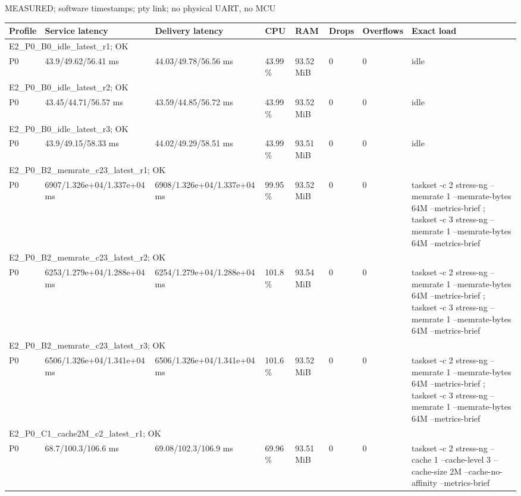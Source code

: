 \par\noindent MEASURED; software timestamps; pty link; no physical UART, no MCU\par
\begin{tabular}{llllllll}
\toprule
Profile & Service latency & Delivery latency & CPU & RAM & Drops & Overflows & Exact load \\
\midrule
\multicolumn{8}{l}{E2\_P0\_B0\_idle\_latest\_r1; OK} \\
P0 & 43.9/49.62/56.41 ms & 44.03/49.78/56.56 ms & 43.99 \% & 93.52 MiB & 0 & 0 & idle \\
\multicolumn{8}{l}{E2\_P0\_B0\_idle\_latest\_r2; OK} \\
P0 & 43.45/44.71/56.57 ms & 43.59/44.85/56.72 ms & 43.99 \% & 93.52 MiB & 0 & 0 & idle \\
\multicolumn{8}{l}{E2\_P0\_B0\_idle\_latest\_r3; OK} \\
P0 & 43.9/49.15/58.33 ms & 44.02/49.29/58.51 ms & 43.99 \% & 93.51 MiB & 0 & 0 & idle \\
\multicolumn{8}{l}{E2\_P0\_B2\_memrate\_c23\_latest\_r1; OK} \\
P0 & 6907/1.326e+04/1.337e+04 ms & 6908/1.326e+04/1.337e+04 ms & 99.95 \% & 93.52 MiB & 0 & 0 & taskset -c 2 stress-ng --memrate 1 --memrate-bytes 64M --metrics-brief ; taskset -c 3 stress-ng --memrate 1 --memrate-bytes 64M --metrics-brief \\
\multicolumn{8}{l}{E2\_P0\_B2\_memrate\_c23\_latest\_r2; OK} \\
P0 & 6253/1.279e+04/1.288e+04 ms & 6254/1.279e+04/1.288e+04 ms & 101.8 \% & 93.54 MiB & 0 & 0 & taskset -c 2 stress-ng --memrate 1 --memrate-bytes 64M --metrics-brief ; taskset -c 3 stress-ng --memrate 1 --memrate-bytes 64M --metrics-brief \\
\multicolumn{8}{l}{E2\_P0\_B2\_memrate\_c23\_latest\_r3; OK} \\
P0 & 6506/1.326e+04/1.341e+04 ms & 6506/1.326e+04/1.341e+04 ms & 101.6 \% & 93.52 MiB & 0 & 0 & taskset -c 2 stress-ng --memrate 1 --memrate-bytes 64M --metrics-brief ; taskset -c 3 stress-ng --memrate 1 --memrate-bytes 64M --metrics-brief \\
\multicolumn{8}{l}{E2\_P0\_C1\_cache2M\_c2\_latest\_r1; OK} \\
P0 & 68.7/100.3/106.6 ms & 69.08/102.3/106.9 ms & 69.96 \% & 93.51 MiB & 0 & 0 & taskset -c 2 stress-ng --cache 1 --cache-level 3 --cache-size 2M --cache-no-affinity --metrics-brief \\

\end{tabular}
